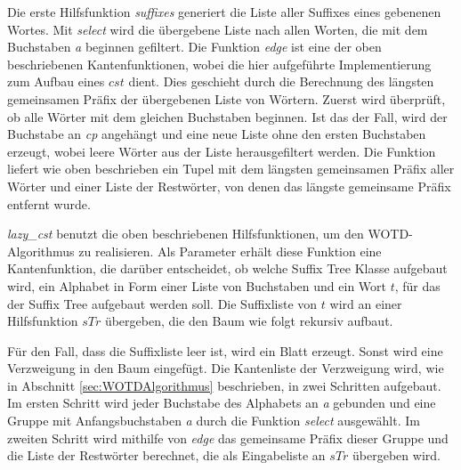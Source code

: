 \documentclass[12pt]{report}
\begin{document}
Die erste Hilfsfunktion \textit{suffixes} generiert die Liste aller Suffixes eines gebenenen Wortes. Mit \textit{select} wird die übergebene Liste nach allen Worten, die mit dem Buchstaben \textit{a} beginnen gefiltert. Die Funktion \textit{edge} ist eine der oben beschriebenen Kantenfunktionen, wobei die hier aufgeführte Implementierung zum Aufbau eines $cst$ dient. Dies geschieht durch die Berechnung des längsten gemeinsamen Präfix der übergebenen Liste von Wörtern. Zuerst wird überprüft, ob alle Wörter mit dem gleichen Buchstaben beginnen. Ist das der Fall, wird der Buchstabe an \textit{cp} angehängt und eine neue Liste ohne den ersten Buchstaben erzeugt, wobei leere Wörter aus der Liste herausgefiltert werden. Die Funktion liefert wie oben beschrieben ein Tupel mit dem längsten gemeinsamen Präfix aller Wörter und einer Liste der Restwörter, von denen das längste gemeinsame Präfix entfernt wurde.

\textit{lazy\_cst} benutzt die oben beschriebenen Hilfsfunktionen, um den WOTD-Algorithmus zu realisieren. Als Parameter erhält diese Funktion eine Kantenfunktion, die darüber entscheidet, ob welche Suffix Tree Klasse aufgebaut wird, ein Alphabet in Form einer Liste von Buchstaben und ein Wort $t$, für das der Suffix Tree aufgebaut werden soll. Die Suffixliste von $t$ wird an einer Hilfsfunktion $sTr$ übergeben, die den Baum wie folgt rekursiv aufbaut.

Für den Fall, dass die Suffixliste leer ist, wird ein Blatt erzeugt. Sonst wird eine Verzweigung in den Baum eingefügt. Die Kantenliste der Verzweigung wird, wie in Abschnitt \ref{sec:WOTDAlgorithmus} beschrieben, in zwei Schritten aufgebaut. Im ersten Schritt wird jeder Buchstabe des Alphabets an \textit{a} gebunden und eine Gruppe mit Anfangsbuchstaben \textit{a} durch die Funktion \textit{select} ausgewählt. Im zweiten Schritt wird mithilfe von \textit{edge} das gemeinsame Präfix dieser Gruppe und die Liste der Restwörter berechnet, die als Eingabeliste an $sTr$ übergeben wird.

\end{document}
